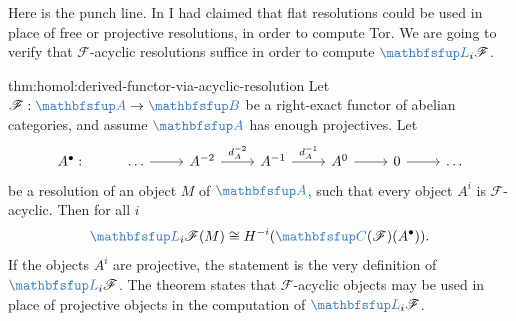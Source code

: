 Here is the punch line. In  I
had claimed that flat resolutions could be used in place of free or
projective resolutions, in order to compute Tor. We are going to
verify that $\mathscr{F}$-acyclic resolutions suffice in order to
compute $\categ{L}_i\mathscr{F}$.

\begin{thm}{}{thm:homol:derived-functor-via-acyclic-resolution}
  Let $\mathscr{F} : \categ{A} \to \categ{B}$ be a right-exact functor
  of abelian categories, and assume $\categ{A}$ has enough
  projectives. Let
  \[\begin{tikzcd}
      A^\bullet : & \dots \arrow[r] & A^{-2} \arrow[r, "d_A^{-2}"] &
      A^{-1} \arrow[r, "d_A^{-1}"] & A^0 \arrow[r] & 0 \arrow[r] &
      \dots
    \end{tikzcd}\] be a resolution of an object $M$ of $\categ{A}$,
  such that every object $A^i$ is $\mathscr{F}$-acyclic. Then for all
  $i$
  \[
    \categ{L}_i\mathscr{F}(M) \cong
    H^{-i}(\categ{C}(\mathscr{F})(A^\bullet)).
  \]
  If the objects $A^i$ are projective, the statement is the very
  definition of $\categ{L}_i\mathscr{F}$. The theorem states that
  $\mathscr{F}$-acyclic objects may be used in place of projective
  objects in the computation of $\categ{L}_i\mathscr{F}$.
\end{thm}
